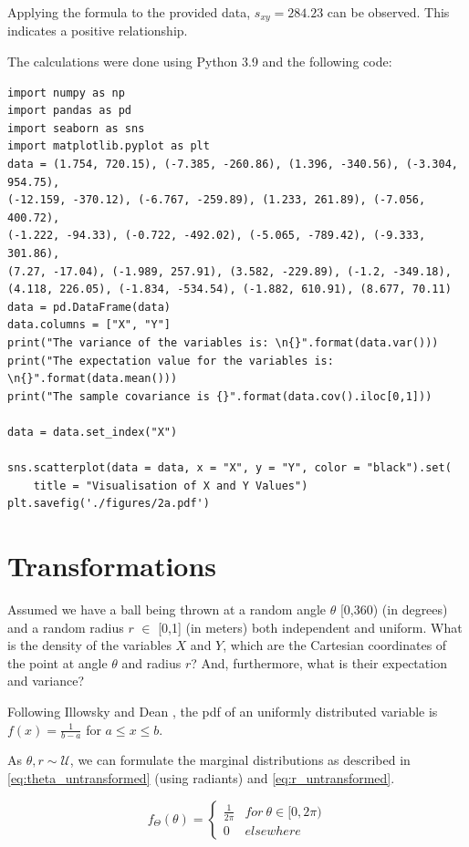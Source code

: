 Applying the formula to the provided data, $s_{xy} = 284.23$ can be observed. This indicates a positive relationship.

The calculations were done using Python 3.9 and the following code:

\begin{verbatim}
import numpy as np
import pandas as pd
import seaborn as sns
import matplotlib.pyplot as plt
data = (1.754, 720.15), (-7.385, -260.86), (1.396, -340.56), (-3.304, 954.75),
(-12.159, -370.12), (-6.767, -259.89), (1.233, 261.89), (-7.056, 400.72), 
(-1.222, -94.33), (-0.722, -492.02), (-5.065, -789.42), (-9.333, 301.86),
(7.27, -17.04), (-1.989, 257.91), (3.582, -229.89), (-1.2, -349.18), 
(4.118, 226.05), (-1.834, -534.54), (-1.882, 610.91), (8.677, 70.11)
data = pd.DataFrame(data)
data.columns = ["X", "Y"]
print("The variance of the variables is: \n{}".format(data.var()))
print("The expectation value for the variables is: \n{}".format(data.mean()))
print("The sample covariance is {}".format(data.cov().iloc[0,1]))

data = data.set_index("X")

sns.scatterplot(data = data, x = "X", y = "Y", color = "black").set(
    title = "Visualisation of X and Y Values")
plt.savefig('./figures/2a.pdf')
\end{verbatim}


\section{Transformations}
Assumed we have a ball being thrown at a random angle $\theta$ [0,360) (in degrees) and a random radius $r$ $\in$ [0,1] (in meters) both independent and uniform. What is the density of the variables $X$ and $Y$, which are the Cartesian coordinates of the point at angle $\theta$ and radius $r$? And, furthermore, what is their expectation and variance?

Following Illowsky and Dean \cite[Chapter~5.2]{illowsky2018introductory}, the pdf of an uniformly distributed variable is $f(x) = \frac{1}{b-a}$ for $a \leq x \leq b$. 

As $\theta,r \sim \mathcal{U}$, we can formulate the marginal distributions as described in \eqref{eq:theta_untransformed} (using radiants) and \eqref{eq:r_untransformed}.

\begin{equation}
f_\Theta(\theta) = 
\begin{cases} 
      \frac{1}{2\pi} & for~\theta \in [0,2\pi)\\
      0&elsewhere
   \end{cases}
\label{eq:theta_untransformed}
\end{equation}

